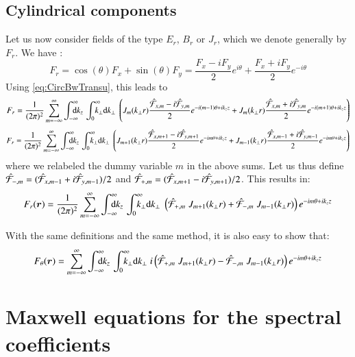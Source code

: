 \subsection{Cylindrical components}

Let us now consider fields of the type $E_r$, $B_r$ or $J_r$, which we
denote generally by $F_r$. We have :
\[ F_r = \cos(\theta) F_x + \sin(\theta) F_y 
= \frac{F_x - iF_y}{2}e^{i\theta} + \frac{F_x +
  iF_y}{2}e^{-i\theta} \] 
Using \cref{eq:CircBwTransu}, this leads to
\begin{align*} 
F_r =   \frac{1}{(2\pi)^2}\sum_{m=-\infty}^{\infty} \Integ{k_z}\,\RInteg{k_\perp }\;
\left(  J_m(k_\perp r) \frac{\spectral{F}_{x,m} -
    i\spectral{F}_{y,m}}{2}e^{-i(m-1)\theta +ik_z z} + J_m(k_\perp r) \frac{\spectral{F}_{x,m} +   i\spectral{F}_{y,m}}{2}e^{-i(m+1)\theta +
    ik_z z} \right) 
\end{align*}
\begin{align*}
F_r =  \frac{1}{(2\pi)^2}\sum_{m=-\infty}^{\infty} \Integ{k_z}\,\RInteg{k_\perp }\;
\left(  J_{m+1}(k_\perp r) \frac{\spectral{F}_{x,m+1} -
    i\spectral{F}_{y,m+1}}{2}e^{-im\theta +ik_z z} + J_{m-1}(k_\perp r) \frac{\spectral{F}_{x,m-1} +   i\spectral{F}_{y,m-1}}{2}e^{-im\theta +
    ik_z z} \right) 
\end{align*}
where we relabeled the dummy variable $m$ in the above sums. Let us
thus define $\hat{\mathcal{F}}_{-,m} = (\hat{\mathcal{F}}_{x,m-1} +
    i\hat{\mathcal{F}}_{y,m-1})/2$ and $\hat{\mathcal{F}}_{+,m} = (\hat{\mathcal{F}}_{x,m+1} -
    i\hat{\mathcal{F}}_{y,m+1})/2$. This results in:
\begin{equation} 
F_r(\vec{r}) =  \frac{1}{(2\pi)^2}\sum_{m=-\infty}^{\infty} \Integ{k_z}\,\RInteg{k_\perp }\;
\left( \spectral{F}_{+,m}\; J_{m+1}(k_\perp r) +\spectral{F}_{-,m}\; J_{m-1}(k_\perp r)
\right)  e^{-im\theta +ik_z z}
\end{equation}

With the same definitions and the same method, it is also easy to show that:
\begin{equation} 
F_\theta(\vec{r}) = \sum_{m=-\infty}^{\infty} \Integ{k_z}\,\RInteg{k_\perp }\;
i\left( \spectral{F}_{+,m}\; J_{m+1}(k_\perp r) - \spectral{F}_{-,m}\; J_{m-1}(k_\perp r)
\right)  e^{-im\theta +ik_z z}
\end{equation}

\section{Maxwell equations for the spectral coefficients}
\label{sec:SpectMaxwell}

